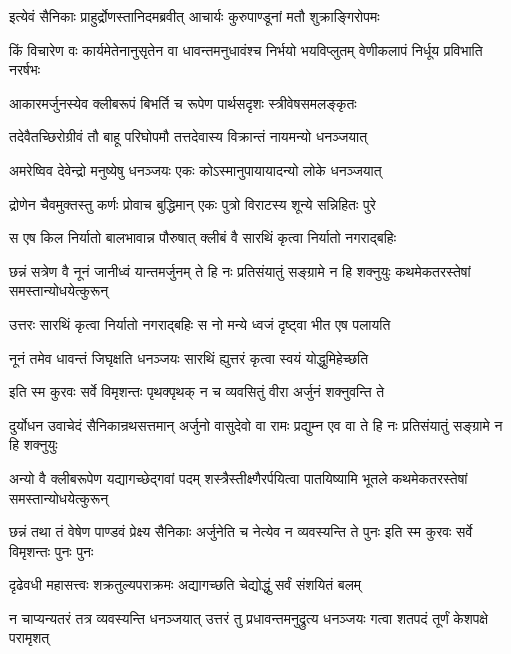 \twolineshloka
{इत्येवं सैनिकाः प्राहुर्द्रोणस्तानिदमब्रवीत्}
{आचार्यः कुरुपाण्डूनां मतौ शुक्राङ्गिरोपमः}


\threelineshloka
{किं विचारेण वः कार्यमेतेनानुसृतेन वा}
{धावन्तमनुधावंश्च निर्भयो भयविप्लुतम्}
{वेणीकलापं निर्धूय प्रविभाति नरर्षभः}


\twolineshloka
{आकारमर्जुनस्येव क्लीबरूपं बिभर्ति च}
{रूपेण पार्थसदृशः स्त्रीवेषसमलङ्कृतः}


\twolineshloka
{तदेवैतच्छिरोग्रीवं तौ बाहू परिघोपमौ}
{तत्तदेवास्य विक्रान्तं नायमन्यो धनञ्जयात्}


\twolineshloka
{अमरेष्विव देवेन्द्रो मनुष्येषु धनञ्जयः}
{एकः कोऽस्मानुपायायादन्यो लोके धनञ्जयात्}


\twolineshloka
{द्रोणेन चैवमुक्तस्तु कर्णः प्रोवाच बुद्धिमान्}
{एकः पुत्रो विराटस्य शून्ये सन्निहितः पुरे}


\twolineshloka
{स एष किल निर्यातो बालभावान्न पौरुषात्}
{क्लीबं वै सारथिं कृत्वा निर्यातो नगराद्बहिः}


\threelineshloka
{छन्नं सत्रेण वै नूनं जानीध्वं यान्तमर्जुनम्}
{ते हि नः प्रतिसंयातुं सङ्ग्रामे न हि शक्नुयुः}
{कथमेकतरस्तेषां समस्तान्योधयेत्कुरून्}


\twolineshloka
{उत्तरः सारथिं कृत्वा निर्यातो नगराद्बहिः}
{स नो मन्ये ध्वजं दृष्ट्वा भीत एष पलायति}




\twolineshloka
{नूनं तमेव धावन्तं जिघृक्षति धनञ्जयः}
{सारथिं ह्युत्तरं कृत्वा स्वयं योद्धुमिहेच्छति}



\twolineshloka
{इति स्म कुरवः सर्वे विमृशन्तः पृथक्पृथक्}
{न च व्यवसितुं वीरा अर्जुनं शक्नुवन्ति ते}


\threelineshloka
{दुर्योधन उवाचेदं सैनिकान्रथसत्तमान्}
{अर्जुनो वासुदेवो वा रामः प्रद्युम्न एव वा}
{ते हि नः प्रतिसंयातुं सङ्ग्रामे न हि शक्नुयुः}


\threelineshloka
{अन्यो वै क्लीबरूपेण यद्यागच्छेद्गवां पदम्}
{शस्त्रैस्तीक्ष्णैरर्पयित्वा पातयिष्यामि भूतले}
{कथमेकतरस्तेषां समस्तान्योधयेत्कुरून्}



\threelineshloka
{छन्नं तथा तं वेषेण पाण्डवं प्रेक्ष्य सैनिकाः}
{अर्जुनेति च नेत्येव न व्यवस्यन्ति ते पुनः}
{इति स्म कुरवः सर्वे विमृशन्तः पुनः पुनः}


\twolineshloka
{दृढेवधी महासत्त्वः शक्रतुल्यपराक्रमः}
{अद्यागच्छति चेद्योद्धुं सर्वं संशयितं बलम्}


\onelineshloka
{न चाप्यन्यतरं तत्र व्यवस्यन्ति धनञ्जयात्}
\twolineshloka
{उत्तरं तु प्रधावन्तमनुद्रुत्य धनञ्जयः}
{गत्वा शतपदं तूर्णं केशपक्षे परामृशत्}



